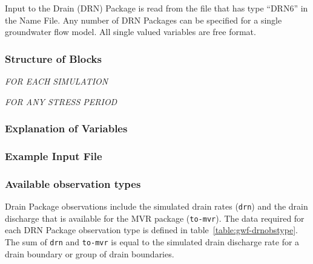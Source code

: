 Input to the Drain (DRN) Package is read from the file that has type ``DRN6'' in the Name File.  Any number of DRN Packages can be specified for a single groundwater flow model.  All single valued variables are free format.

\vspace{5mm}
\subsubsection{Structure of Blocks}
\vspace{5mm}

\noindent \textit{FOR EACH SIMULATION}


\vspace{5mm}
\noindent \textit{FOR ANY STRESS PERIOD}


\vspace{5mm}
\subsubsection{Explanation of Variables}
\begin{description}

\end{description}

\vspace{5mm}
\subsubsection{Example Input File}


\vspace{5mm}
\subsubsection{Available observation types}
Drain Package observations include the simulated drain rates (\texttt{drn}) and the drain discharge that is available for the MVR package (\texttt{to-mvr}). The data required for each DRN Package observation type is defined in table~\ref{table:gwf-drnobstype}. The sum of \texttt{drn} and \texttt{to-mvr} is equal to the simulated drain discharge rate for a drain boundary or group of drain boundaries.

